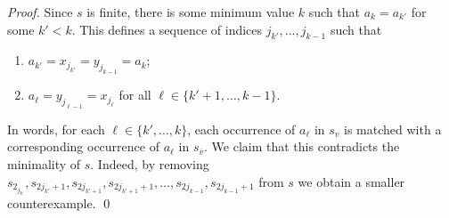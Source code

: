 \documentclass{llncs}
\begin{document}
\begin{proof}
  Since $s$ is finite, there is some minimum value $k$ such that
  $a_{k}=a_{k'}$ for some $k' < k$.  This defines a sequence of indices
  $j_{k'},\ldots,j_{k-1}$ such that
  \begin{enumerate}
     \item $a_{k'}=x_{j_{k'}}=y_{j_{k-1}}=a_{k}$; 
     \item $a_{\ell}=y_{j_{\ell-1}}=x_{j_\ell}$ for all $\ell\in\{k'+1,\ldots,k-1\}$.
  \end{enumerate}
  In words, for each $\ell\in\{k',\ldots,k\}$, each occurrence of $a_\ell$ in $s_v$ is matched with a corresponding
  occurrence of $a_\ell$ in $s_{\overline{v}}$.
  We claim that this contradicts
  the minimality of $s$. Indeed, by removing
  $s_{2_{j_{k'}}},s_{2j_{k'}+1},s_{2j_{k'+1}},s_{2j_{k'+1}+1},\ldots,s_{2j_{k-1}},s_{2j_{k-1}+1}$
  from $s$ we obtain a smaller counterexample.
  \qed
\end{proof}
\end{document}
